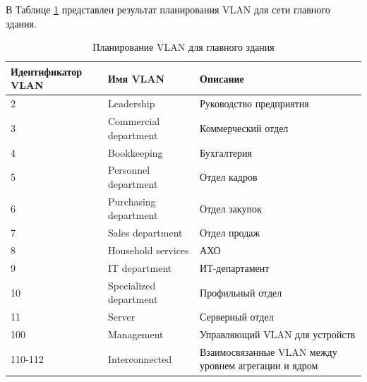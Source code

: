 \documentclass[14pt, a4paper]{extarticle}
\numberwithin{equation}{section}
\begin{document}
В Таблице \ref{table:mainDepVlan} представлен результат планирования VLAN для сети главного здания.
\begin{table}[H]
\centering
\small
\caption{Планирование VLAN для главного здания}
\label{table:mainDepVlan}
\begin{tabular}{|l|l|m{6cm}|}
\hline
\textbf{Идентификатор VLAN} & \textbf{Имя VLAN} & \textbf{Описание} \\
\hline
2 & Leadership & Руководство предприятия \\
\hline
3 & Commercial department & Коммерческий отдел \\
\hline
4 & Bookkeeping & Бухгалтерия \\
\hline
5 & Personnel department & Отдел кадров \\
\hline 
6 & Purchasing department & Отдел закупок \\
\hline 
7 & Sales department & Отдел продаж \\
\hline 
8 & Household services & АХО \\
\hline 
9 & IT department & ИТ-департамент \\
\hline
10 & Specialized department & Профильный отдел \\
\hline
11 & Server & Серверный отдел \\
\hline
100 & Management & Управляющий VLAN для устройств \\
\hline
110-112 & Interconnected & Взаимосвязанные VLAN между уровнем агрегации и ядром \\
\hline
\end{tabular}
\end{table}
\end{document}
